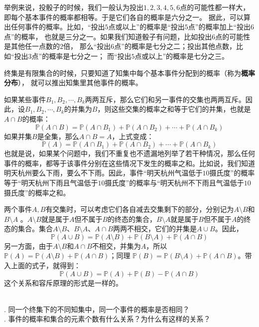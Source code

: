 \documentclass[12pt,UTF8]{ctexbook}
\begin{document}
举例来说，投骰子的时候，我们一般认为投出$1,2,3,4,5,6$点的可能性都一样大，
即每个基本事件的概率都相等。于是它们各自的概率是六分之一。
据此，可以算出任何事件的概率。比如，“投出$5$点或以上”的概率是“投出$5$点”的概率加上“投出$6$点”的概率，
也就是三分之一。如果我们知道骰子有问题，比如投出$6$点的可能性是其他任一点数的$2$倍，
那么“投出$6$点”的概率是七分之二；投出其他点数，比如“投出$3$点”的概率是七分之一；
而“投出$5$点或以上”的概率是七分之三。

终集是有限集合的时候，只要知道了知集中每个基本事件分配到的概率（称为\textbf{概率分布}），
就可以推出知集里其他事件的概率。

如果某些事件$B_1, B_2, \cdots, B_k$两两互斥，那么它们和另一事件的交集也两两互斥。因此，设$B_1, B_2, \cdots, B_k$的并集为$B$，则这些交集的概率之和等于它们的并集，也就是$A\cap B$的概率：
$$
\mathbb{P}(A\cap B) = \mathbb{P}(A\cap B_1) + \mathbb{P}(A\cap B_2) + \cdots + \mathbb{P}(A\cap B_k)
$$
如果并集$B$是全集，那么$A\cap B = A$，上式变成：
$$
\mathbb{P}(A) = \mathbb{P}(A\cap B_1) + \mathbb{P}(A\cap B_2) + \cdots + \mathbb{P}(A\cap B_k)
$$
也就是说，如果某个问题中，我们不重复也不遗漏地列举了若干种情况，那么任何事件的概率，都等于该事件分别在这些情况下发生的概率之和。比如说，我们知道明天杭州要么下雨，要么不下雨。因此，事件“明天杭州气温低于$10$摄氏度”的概率等于“明天杭州下雨且气温低于$10$摄氏度”的概率与“明天杭州不下雨且气温低于$10$摄氏度”的概率之和。

两个事件$A, B$有交集时，可以考虑它们各自减去交集剩下的部分，分别记为$A\setminus B$和$B\setminus A$ 。$A \setminus B$就是属于$A$但不属于$B$的终态的集合，$B \setminus A$就是属于$B$但不属于$A$的终态的集合。集合$A \setminus B$、$B \setminus A$、$A\cap B$两两不相交，它们的并集是$A\cup B$。因此，
$$
\mathbb{P}(A\cup B) = \mathbb{P}(A \setminus B) + \mathbb{P}(B \setminus A) + \mathbb{P}(A \cap B)
$$
另一方面，由于$A \setminus B$和$A\cap B$不相交，并集为$A$，所以$ \mathbb{P}(A) = \mathbb{P}(A \setminus B) +  \mathbb{P}(A \cap B)$；同理 $\mathbb{P}(B) = \mathbb{P}(B \setminus A) + \mathbb{P}(A \cap B)$。带入上面的式子，就得到：
$$
\mathbb{P}(A\cup B) = \mathbb{P}(A) + \mathbb{P}(B) - \mathbb{P}(A \cap B)
$$
这个关系和容斥原理的形式是一样的。


\begin{sk}
    \mbox{} \\
    . 同一个终集下的不同知集中，同一个事件的概率是否相同？\\
    . 事件的概率和集合的元素个数有什么关系？为什么有这样的关系？
\end{sk}
\end{document}
